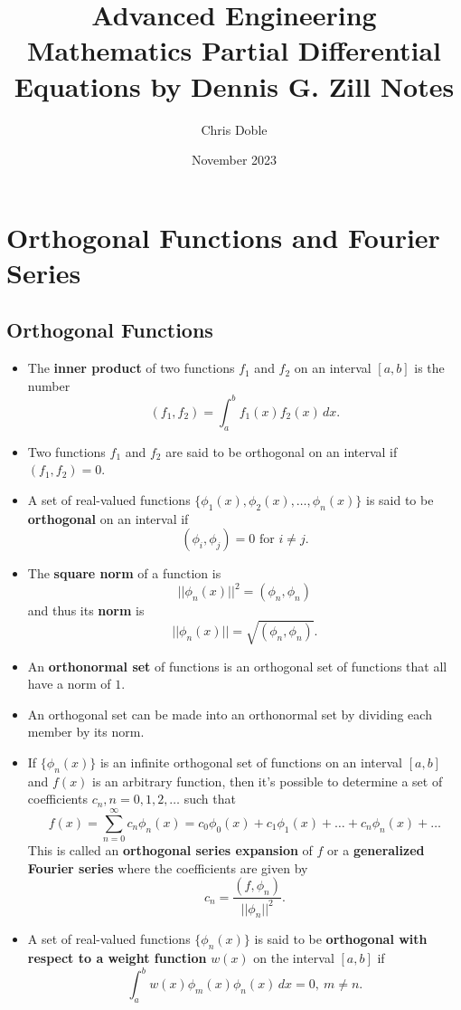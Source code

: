 \documentclass{article}
\title{Advanced Engineering Mathematics Partial Differential Equations by Dennis G. Zill Notes}
\author{Chris Doble}
\date{November 2023}
\begin{document}
\maketitle

\tableofcontents

\setcounter{section}{11}
\section{Orthogonal Functions and Fourier Series}

\subsection{Orthogonal Functions}

\begin{itemize}
  \item The \textbf{inner product} of two functions $f_1$ and $f_2$ on an interval $[a, b]$ is the number \[(f_1, f_2) = \int_a^b f_1(x) f_2(x) \,d x.\]

  \item Two functions $f_1$ and $f_2$ are said to be orthogonal on an interval if $(f_1, f_2) = 0$.

  \item A set of real-valued functions $\{\phi_1(x), \phi_2(x), \ldots, \phi_n(x)\}$ is said to be \textbf{orthogonal} on an interval if \[(\phi_i, \phi_j) = 0 \text{ for } i \ne j.\]

  \item The \textbf{square norm} of a function is \[||\phi_n(x)||^2 = (\phi_n, \phi_n)\] and thus its \textbf{norm} is \[||\phi_n(x)|| = \sqrt{(\phi_n, \phi_n)}.\]

  \item An \textbf{orthonormal set} of functions is an orthogonal set of functions that all have a norm of $1$.

  \item An orthogonal set can be made into an orthonormal set by dividing each member by its norm.

  \item If $\{\phi_n(x)\}$ is an infinite orthogonal set of functions on an interval $[a, b]$ and $f(x)$ is an arbitrary function, then it's possible to determine a set of coefficients $c_n, n = 0, 1, 2, \ldots$ such that \[f(x) = \sum_{n = 0}^\infty c_n \phi_n(x) = c_0 \phi_0(x) + c_1 \phi_1(x) + \ldots + c_n \phi_n(x) + \ldots\] This is called an \textbf{orthogonal series expansion} of $f$ or a \textbf{generalized Fourier series} where the coefficients are given by \[c_n = \frac{(f, \phi_n)}{||\phi_n||^2}.\]

  \item A set of real-valued functions $\{\phi_n(x)\}$ is said to be \textbf{orthogonal with respect to a weight function} $w(x)$ on the interval $[a, b]$ if \[\int_a^b w(x) \phi_m(x) \phi_n(x) \,d x = 0,\ m \ne n.\]
\end{itemize}
\end{document}
